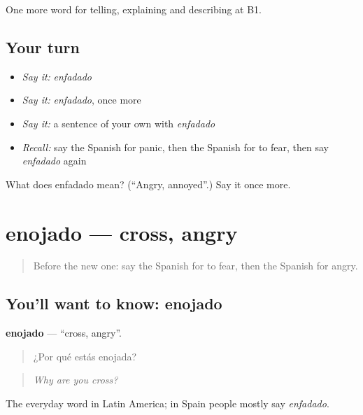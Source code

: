\begin{grammarlens}[title={What you've built}]
One more word for telling, explaining and describing at B1.
\end{grammarlens}

\subsection*{Your turn}
\begin{itemize}
\raggedright
  \item \emph{Say it:} \emph{enfadado}
  \item \emph{Say it:} \emph{enfadado}, once more
  \item \emph{Say it:} a sentence of your own with \emph{enfadado}
  \item \emph{Recall:} say the Spanish for panic, then the Spanish for to fear, then say \emph{enfadado} again
\end{itemize}

\begin{tcolorbox}[breakable,colback=teal!4,colframe=teal!35!black,title={Before you move on}]
What does enfadado mean? (\textquotedblleft{}Angry, annoyed\textquotedblright{}.) Say it once more.
\end{tcolorbox}
\section[enojado]{enojado — cross, angry}

\label{lesson:ES-C707-enojado}



\begin{quote}
Before the new one: say the Spanish for to fear, then the Spanish for angry.
\end{quote}

\subsection*{You'll want to know: enojado}
\textbf{enojado} — \textquotedblleft{}cross, angry\textquotedblright{}.

\begin{quote}
¿Por qué estás enojada?
\end{quote}

\begin{quote}
\emph{Why are you cross?}
\end{quote}

The everyday word in Latin America; in Spain people mostly say \emph{enfadado}.

